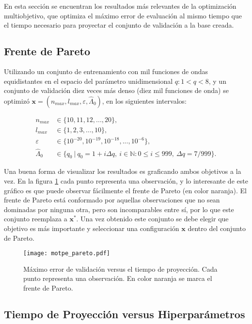 En esta sección se encuentran los resultados más relevantes de la optimización multiobjetivo, que optimiza el máximo error de evaluación al mismo tiempo que el tiempo necesario para proyectar el conjunto de validación a la base creada.

\subsection{Frente de Pareto}

Utilizando un conjunto de entrenamiento con mil funciones de ondas equidistantes en el espacio del parámetro unidimensional $q: 1 < q < 8$, y un conjunto de validación diez veces más denso (diez mil funciones de onda) se optimizó $\textbf{x} = (n_{max}, l_{max},\varepsilon, \hat{\Lambda}_0)$, en los siguientes intervalos:

\begin{align*}
n_{max} &\in \{10, 11, 12, ..., 20\},\\
l_{max} &\in \{1, 2, 3, ..., 10 \},\\
\varepsilon &\in \{  10^{-20}, 10^{-19}, 10^{-18}, ..., 10^{-6}\}, \\
\hat{\Lambda}_0 &\in \{q_0 \ | \ q_0 = 1 + i \Delta q, \ i\in \mathbb{N} : 0 \le i \le 999, \ \Delta q = 7/999 \}.
\end{align*}

Una buena forma de visualizar los resultados es graficando ambos objetivos a la vez. En la figura \ref{fig:pareto} cada punto representa una observación, y lo interesante de este gráfico es que puede observar fácilmente el frente de Pareto (en color naranja). El frente de Pareto está conformado por aquellas observaciones que no sean dominadas por ninguna otra, pero son incomparables entre sí, por lo que este conjunto reemplaza a $\textbf{x}^*$. Una vez obtenido este conjunto se debe elegir que objetivo es más importante y seleccionar una configuración $\textbf{x}$ dentro del conjunto de Pareto.

\begin{figure}[h!]
\centering
\texttt{[image: motpe\_pareto.pdf]}
\caption{Máximo error de validación versus el tiempo de proyección. Cada punto representa una observación. En color naranja se marca el frente de Pareto.}
\label{fig:pareto}
\end{figure}

\subsection{Tiempo de Proyección versus Hiperparámetros}

